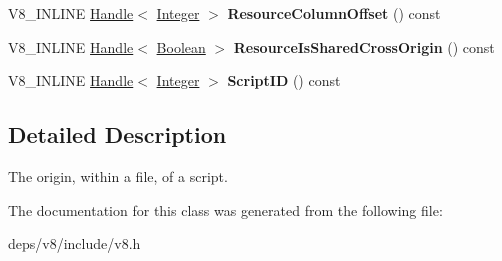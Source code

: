 \begin{DoxyCompactItemize}
\item 
\hypertarget{classv8_1_1_script_origin_a6d1b4cb1be2b6589151a029974cd1a60}{}V8\+\_\+\+I\+N\+L\+I\+N\+E \hyperlink{classv8_1_1_handle}{Handle}$<$ \hyperlink{classv8_1_1_integer}{Integer} $>$ {\bfseries Resource\+Column\+Offset} () const \label{classv8_1_1_script_origin_a6d1b4cb1be2b6589151a029974cd1a60}

\item 
\hypertarget{classv8_1_1_script_origin_a632d2d30405d42512af609861e486bf2}{}V8\+\_\+\+I\+N\+L\+I\+N\+E \hyperlink{classv8_1_1_handle}{Handle}$<$ \hyperlink{classv8_1_1_boolean}{Boolean} $>$ {\bfseries Resource\+Is\+Shared\+Cross\+Origin} () const \label{classv8_1_1_script_origin_a632d2d30405d42512af609861e486bf2}

\item 
\hypertarget{classv8_1_1_script_origin_abc222706ba9cdd48f8efaf4be227c078}{}V8\+\_\+\+I\+N\+L\+I\+N\+E \hyperlink{classv8_1_1_handle}{Handle}$<$ \hyperlink{classv8_1_1_integer}{Integer} $>$ {\bfseries Script\+I\+D} () const \label{classv8_1_1_script_origin_abc222706ba9cdd48f8efaf4be227c078}

\end{DoxyCompactItemize}


\subsection{Detailed Description}
The origin, within a file, of a script. 

The documentation for this class was generated from the following file\+:\begin{DoxyCompactItemize}
\item 
deps/v8/include/v8.\+h\end{DoxyCompactItemize}
